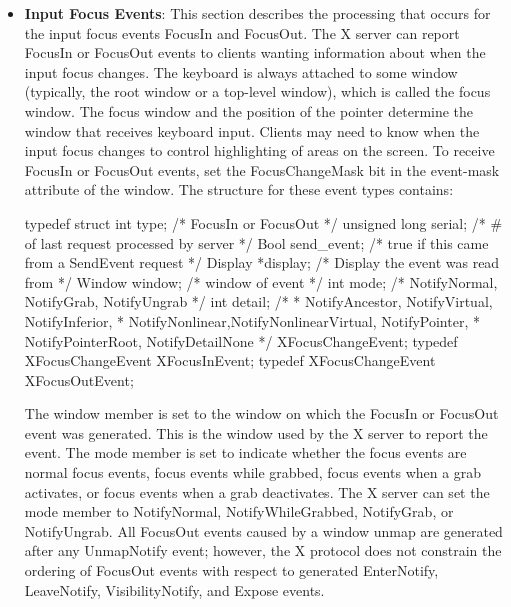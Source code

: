 \documentclass{report}
\begin{document}
\begin{itemize}
        \item \textbf{Input Focus Events}: This section describes the processing that occurs for the input focus events FocusIn and FocusOut. The X server can report FocusIn or FocusOut events to clients wanting information about when the input focus changes. The keyboard is always attached to some window (typically, the root window or a top-level window), which is called the focus window. The focus window and the position of the pointer determine the window that receives keyboard input. Clients may need to know when the input focus changes to control highlighting of areas on the screen.
            \bigbreak \noindent 
            To receive FocusIn or FocusOut events, set the FocusChangeMask bit in the event-mask attribute of the window.
            \bigbreak \noindent 
            The structure for these event types contains:
            \bigbreak \noindent 
           \begin{cppcode}
                typedef struct {
                    int type;               /* FocusIn or FocusOut */
                    unsigned long serial;   /* # of last request processed by server */
                    Bool send_event;        /* true if this came from a SendEvent request */
                    Display *display;       /* Display the event was read from */
                    Window window;          /* window of event */
                    int mode;               /* NotifyNormal, NotifyGrab, NotifyUngrab */
                    int detail;
                    /*
                    * NotifyAncestor, NotifyVirtual, NotifyInferior,
                    * NotifyNonlinear,NotifyNonlinearVirtual, NotifyPointer,
                    * NotifyPointerRoot, NotifyDetailNone
                    */
                } XFocusChangeEvent;
                typedef XFocusChangeEvent XFocusInEvent;
                typedef XFocusChangeEvent XFocusOutEvent;
            \end{cppcode}
            \bigbreak \noindent 
            The window member is set to the window on which the FocusIn or FocusOut event was generated. This is the window used by the X server to report the event. The mode member is set to indicate whether the focus events are normal focus events, focus events while grabbed, focus events when a grab activates, or focus events when a grab deactivates. The X server can set the mode member to NotifyNormal, NotifyWhileGrabbed, NotifyGrab, or NotifyUngrab.
            \bigbreak \noindent 
            All FocusOut events caused by a window unmap are generated after any UnmapNotify event; however, the X protocol does not constrain the ordering of FocusOut events with respect to generated EnterNotify, LeaveNotify, VisibilityNotify, and Expose events.

\end{itemize}
\end{document}
